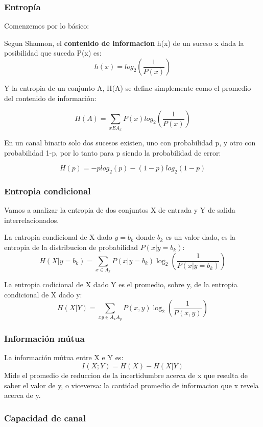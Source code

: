 \documentclass[a4paper,10pt]{report}
\begin{document}
\subsubsection{Entropía}

Comenzemos por lo básico:

Segun Shannon, el \textbf{contenido de informacion} h(x) de un suceso x dada la posibilidad que suceda P(x) es:
$$ h(x) = log_{2}\left(\frac{1}{P(x)}\right) $$

Y la entropia de un conjunto A, H(A) se define simplemente como el promedio del contenido de información:

$$ H(A) = \sum_{x E A_{x}} P(x)log_{2}\left(\frac{1}{P(x)}\right)$$

En un canal binario solo dos sucesos existen, uno con probabilidad p, y otro con probabilidad 1-p, por lo tanto para p siendo la probabilidad de error:

$$ H(p) = -p log_{2}(p)-(1-p)log_{2}(1-p) $$

\subsubsection{Entropia condicional}

Vamos a analizar la entropia de dos conjuntos X de entrada y Y de salida interrelacionados.

La entropia condicional de X dado $y=b_k$ donde $b_k$ es un valor dado, es la entropia de la distribucion de probabilidad $P(x|y=b_{k})$:
$$H(X|y=b_{k}) = \sum_{x \in A_{x}} P(x | y=b_{k})\log_2\left(\frac{1}{P(x | y=b_{k})}\right) $$

La entropia codicional de X dado Y es el promedio, sobre y, de la entropia condicional de X dado y:
$$H(X|Y) =  \sum_{xy \in A_{x}A_{y}} P(x,y)\log_2\left(\frac{1}{P(x,y)}\right) $$

\subsubsection{Información mútua}
La información mútua entre X e Y es:
$$I(X;Y) = H(X)-H(X|Y)$$
Mide el promedio de reduccion de la incertidumbre acerca de x que resulta de saber el valor de y, o viceversa: la cantidad promedio de informacion que x revela acerca de y.

\subsubsection{Capacidad de canal}
\end{document}
